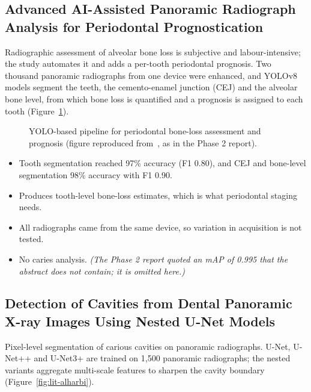 \subsection{Advanced AI-Assisted Panoramic Radiograph Analysis for Periodontal Prognostication~\cite{jundaeng2025advanced}}
 Radiographic assessment of alveolar bone loss is subjective and
labour-intensive; the study automates it and adds a per-tooth periodontal prognosis.
 Two thousand panoramic radiographs from one device were enhanced, and YOLOv8
models segment the teeth, the cemento-enamel junction (CEJ) and the alveolar bone level, from which
bone loss is quantified and a prognosis is assigned to each tooth (Figure~\ref{fig:lit-jundaeng}).

\begin{figure}[!htbp]
\centering
{}
\caption[YOLO-based pipeline for periodontal bone-loss assessment]{YOLO-based pipeline for
periodontal bone-loss assessment and prognosis (figure reproduced from~\cite{jundaeng2025advanced},
as in the Phase 2 report).}
\label{fig:lit-jundaeng}
\end{figure}

\begin{itemize}
\item Tooth segmentation reached 97\% accuracy (F1 0.80), and CEJ and bone-level segmentation 98\%
  accuracy with F1 0.90.
\item Produces tooth-level bone-loss estimates, which is what periodontal staging needs.
\end{itemize}
\begin{itemize}
\item All radiographs came from the same device, so variation in acquisition is not tested.
\item No caries analysis. \emph{(The Phase 2 report quoted an mAP of 0.995 that the abstract does not
  contain; it is omitted here.)}
\end{itemize}

\subsection{Detection of Cavities from Dental Panoramic X-ray Images Using Nested U-Net Models~\cite{alharbi2023detection}}
 Pixel-level segmentation of carious cavities on panoramic radiographs.
 U-Net, U-Net++ and U-Net3+ are trained on 1,500 panoramic radiographs; the
nested variants aggregate multi-scale features to sharpen the cavity boundary
(Figure~\ref{fig:lit-alharbi}).

